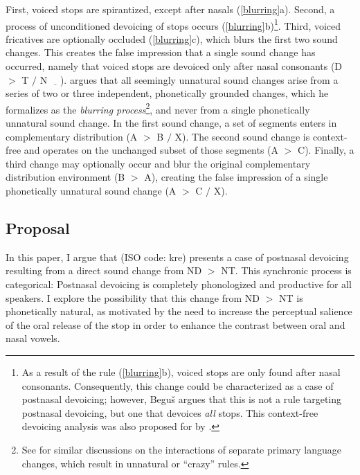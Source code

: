 \documentclass[output=paper,hidelinks]{langscibook}
\begin{document}
First, voiced stops are spirantized, except after nasals (\ref{blurring}a). Second, a process of unconditioned devoicing of stops occurs (\ref{blurring}b)\footnote{As a result of the rule (\ref{blurring}b), voiced stops are only found after nasal consonants. Consequently, this change could be characterized as a case of postnasal devoicing; however, Begu\v{s} argues that this is not a rule targeting postnasal devoicing, but one that devoices \textit{all} stops. This context-free devoicing analysis was also proposed for  by \citet{Hyman2001}.}. Third, voiced fricatives are optionally occluded (\ref{blurring}c), which blurs the first two sound changes. This creates the false impression that a single sound change has occurred, namely that voiced stops are devoiced only after nasal consonants (D $>$ T $/$ N $\underline{\hspace{1em}}$). \citet{Begus2019} argues that all seemingly unnatural sound changes arise from a series of two or three independent, phonetically grounded changes, which he formalizes as the \textit{blurring process}\footnote{See \citet{Harris2005} for similar discussions on the interactions of separate primary language changes, which result in unnatural or ``crazy'' rules.}, and never from a single phonetically unnatural sound change. In the first sound change, a set of segments enters in complementary distribution (A $>$ B $/$ X). The second sound change is context-free and operates on the unchanged subset of those segments (A $>$ C). Finally, a third change may optionally occur and blur the original complementary distribution environment (B $>$ A), creating the false impression of a single phonetically unnatural sound change (A $>$ C $/$ X). 

\subsection{Proposal}

In this paper, I argue that  (ISO code: kre) presents a case of postnasal devoicing resulting from a direct sound change from ND $>$ NT. This synchronic process is categorical: Postnasal devoicing is completely phonologized and productive for all speakers. I explore the possibility that this change from ND $>$ NT is phonetically natural, as motivated by the need to increase the perceptual salience of the oral release of the stop in order to enhance the contrast between oral and nasal vowels.
\end{document}
